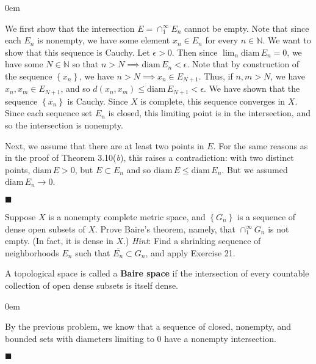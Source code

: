 \documentclass[12pt]{article}
\renewcommand{\qed}{\hfill$\blacksquare$}
\renewenvironment{proof}{\begin{addmargin}[1em]{0em}\begin{newproof}}{\end{newproof}\end{addmargin}\qed}
\newenvironment{problem}[2][Exercise]{\begin{trivlist}
\item[\hskip \labelsep {\bfseries #1}\hskip \labelsep {\bfseries #2.}]}{\end{trivlist}}
\begin{document}
\begin{proof}
We first show that the intersection $E = \cap_1^{\infty} E_n$ cannot be empty. Note that since each $E_n$ is nonempty, we have some element $x_n \in E_n$ for every $n\in \mathbb{N}$. We want to show that this sequence is Cauchy. Let $\epsilon>0$. Then since $\lim_n \text{diam} \, E_n=0$, we have some $N\in \mathbb{N}$ so that $n>N \implies \text{diam} \, E_n<\epsilon$. Note that by construction of the sequence $\left\{ x_n\right\}$, we have $n>N \implies x_n \in E_{N+1}$. Thus, if $n,m > N$, we have $x_n, x_m \in E_{N+1}$, and so $d\left(x_n,x_m\right) \leq \text{diam}\, E_{N+1} < \epsilon$. We have shown that the sequence $\left\{x_n\right\}$ is Cauchy. Since $X$ is complete, this sequence converges in $X$. Since each sequence set $E_n$ is closed, this limiting point is in the intersection, and so the intersection is nonempty.

Next, we assume that there are at least two points in $E$. For the same reasons as in the proof of Theorem 3.10(\textit{b}), this raises a contradiction: with two distinct points, $\text{diam}\, E > 0$, but $E \subset E_n$ and so $\text{diam}\, E \leq \text{diam}\, E_n$. But we assumed $\text{diam}\, E_n \rightarrow 0$.
\end{proof}




\begin{problem}{3.22}
Suppose $X$ is a nonempty complete metric space, and $\left\{G_n\right\}$ is a sequence of dense open subsets of $X$. Prove Baire's theorem, namely, that $\cap_1^{\infty} G_n$ is not empty. (In fact, it is dense in $X$.) \textit{Hint}: Find a shrinking sequence of neighborhoods $E_n$ such that $\overline{E_n}\subset G_n$, and apply Exercise 21.
\end{problem}
{\color{red}A topological space is called a \textbf{Baire space} if the intersection of every countable collection of open dense subsets is itself dense.}\\

\begin{proof}
By the previous problem, we know that a sequence of closed, nonempty, and bounded  sets with diameters limiting to $0$ have a nonempty intersection.
\end{proof}
\end{document}
